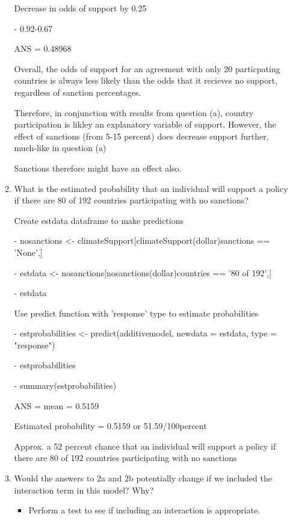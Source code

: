 \documentclass[12pt,letterpaper]{article}
\begin{document}
\begin{enumerate}
\begin{enumerate}
Decrease in odds of support by 0.25

	- 0.92-0.67 
	
ANS = 0.48968
	
	Overall, the odds of support for an agreement with only 20 particpating countries is always less likely than the odds that it recieves no support, regardless of sanction percentages. 
	
	Therefore, in conjunction with results from question (a), country participation is likley an explanatory variable of support. However, the effect of sanctions (from 5-15 percent) does decrease support further, much-like in question (a)
	
	Sanctions therefore might have an effect also. 
	
	
		\vspace{1cm}
	
		
		\item
		What is the estimated probability that an individual will support a policy if there are 80 of 192 countries participating with no sanctions? 
	
		
Create estdata dataframe to make predictions

		- nosanctions <-  climateSupport[climateSupport(dollar)sanctions == 'None',]
		
		- estdata <- nosanctions[nosanctions(dollar)countries == '80 of 192',]
		
		- estdata
		
Use predict function with 'response' type to estimate probabilities
	
		- estprobabilities <- predict(additivemodel, newdata = estdata, type = "response")
		
		- estprobabilities
		
		- summary(estprobabilities) 
		
		ANS = mean = 0.5159
	
	Estimated probability = 0.5159 or 51.59/100percent
	\vspace{1cm}
	
Approx. a 52 percent chance that an individual will support a policy if there are 80 of 192 countries participating with no sanctions
\vspace{1cm}

	\item
Would the answers to 2a and 2b potentially change if we included the interaction term in this model? Why? 
		\begin{itemize}
			\item Perform a test to see if including an interaction is appropriate.
		\end{itemize}


\end{enumerate}
\end{enumerate}
\end{document}
